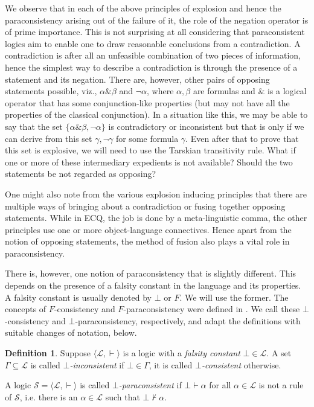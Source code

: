 \documentclass[submission]{eptcs}
\newcommand{\lang}{\mathcal{L}}
\theoremstyle{definition}
\newtheorem{dfn}[thm]{Definition}
\begin{document}
We observe that in each of the above principles of explosion and hence the paraconsistency arising out of the failure of it, the role of the negation operator is of prime importance. This is not surprising at all considering that paraconsistent logics aim to enable one to draw reasonable conclusions from a contradiction. A contradiction is after all an unfeasible combination of two pieces of information, hence the simplest way to describe a contradiction is through the presence of a statement and its negation. There are, however, other pairs of opposing statements possible, viz., $\alpha\&\beta$ and $\neg\alpha$, where $\alpha,\beta$ are formulas and $\&$ is a logical operator that has some conjunction-like properties (but may not have all the properties of the classical conjunction). In a situation like this, we may be able to say that the set $\{\alpha\&\beta,\neg\alpha\}$ is contradictory or inconsistent but that is only if we can derive from this set $\gamma,\neg\gamma$ for some formula $\gamma$. Even after that to prove that this set is explosive, we will need to use the Tarskian transitivity rule. What if one or more of these intermediary expedients is not available? Should the two statements be not regarded as opposing?

One might also note from the various explosion inducing principles that there are multiple ways of bringing about a contradiction or fusing together opposing statements. While in ECQ, the job is done by a meta-linguistic comma, the other principles use one or more object-language connectives. Hence apart from the notion of opposing statements, the method of fusion also plays a vital role in paraconsistency.

There is, however, one notion of paraconsistency that is slightly different. This depends on the presence of a falsity constant in the language and its properties. A falsity constant is usually denoted by $\bot$ or $F$. We will use the former. The concepts of $F$-consistency and $F$-paraconsistency were defined in \cite{Robles2009}. We call these $\bot$-consistency and $\bot$-paraconsistency, respectively, and adapt the definitions with suitable changes of notation, below.

\begin{dfn}
Suppose $\langle\lang,\vdash\rangle$ is a logic with a \emph{falsity constant} $\bot\in\lang$. A set $\Gamma\subseteq\lang$ is called \emph{$\bot$-inconsistent} if $\bot\in\Gamma$, it is called \emph{$\bot$-consistent} otherwise.

A logic $\mathcal{S}=\langle\lang,\vdash\rangle$ is called \emph{$\bot$-paraconsistent} if $\bot\vdash\alpha$ for all $\alpha\in\lang$ is not a rule of $\mathcal{S}$, i.e. there is an $\alpha\in\lang$ such that $\bot\nvdash\alpha$.
\end{dfn}
\end{document}
